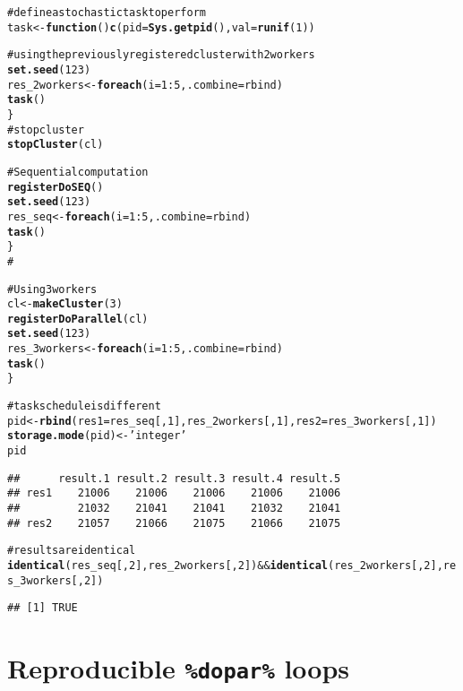 \documentclass[a4paper,12pt]{article}\usepackage{graphicx, color}
\makeatletter
\newcommand{\hlfunctioncall}[1]{\textcolor[rgb]{0.501960784313725,0,0.329411764705882}{\textbf{#1}}}%
\newcommand{\hlstring}[1]{\textcolor[rgb]{0.6,0.6,1}{#1}}%
\newcommand{\hlcomment}[1]{\textcolor[rgb]{0.180392156862745,0.6,0.341176470588235}{#1}}%
\newenvironment{kframe}{%
 \def\at@end@of@kframe{}%
 \ifinner\ifhmode%
  \def\at@end@of@kframe{\end{minipage}}%
  \begin{minipage}{\columnwidth}%
 \fi\fi%
 \def\FrameCommand##1{\hskip\@totalleftmargin \hskip-\fboxsep
 \colorbox{shadecolor}{##1}\hskip-\fboxsep
     \hskip-\linewidth \hskip-\@totalleftmargin \hskip\columnwidth}%
 \MakeFramed {\advance\hsize-\width
   \@totalleftmargin\z@ \linewidth\hsize
   \@setminipage}}%
 {\par\unskip\endMakeFramed%
 \at@end@of@kframe}
\newenvironment{knitrout}{}{} %
\renewenvironment{knitrout}{\begin{footnotesize}}{\end{footnotesize}}
\makeatother
\begin{document}
\begin{knitrout}
\color{fgcolor}\begin{kframe}
\begin{alltt}

\hlcomment{# define a stochastic task to perform}
task <- \hlfunctioncall{function}() \hlfunctioncall{c}(pid=\hlfunctioncall{Sys.getpid}(), val=\hlfunctioncall{runif}(1))

\hlcomment{# using the previously registered cluster with 2 workers}
\hlfunctioncall{set.seed}(123)
res_2workers <- \hlfunctioncall{foreach}(i=1:5, .combine=rbind) %dorng% \{
	\hlfunctioncall{task}()
\}
\hlcomment{# stop cluster}
\hlfunctioncall{stopCluster}(cl)

\hlcomment{# Sequential computation}
\hlfunctioncall{registerDoSEQ}()
\hlfunctioncall{set.seed}(123)
res_seq <- \hlfunctioncall{foreach}(i=1:5, .combine=rbind) %dorng% \{
	\hlfunctioncall{task}() 
\}
\hlcomment{#}

\hlcomment{# Using 3 workers}
cl <- \hlfunctioncall{makeCluster}(3)
\hlfunctioncall{registerDoParallel}(cl)
\hlfunctioncall{set.seed}(123)
res_3workers <- \hlfunctioncall{foreach}(i=1:5, .combine=rbind) %dorng% \{ 
	\hlfunctioncall{task}()
\}

\hlcomment{# task schedule is different}
pid <- \hlfunctioncall{rbind}(res1=res_seq[,1], res_2workers[,1], res2=res_3workers[,1])
\hlfunctioncall{storage.mode}(pid) <- \hlstring{'integer'}
pid
\end{alltt}
\begin{verbatim}
##      result.1 result.2 result.3 result.4 result.5
## res1    21006    21006    21006    21006    21006
##         21032    21041    21041    21032    21041
## res2    21057    21066    21075    21066    21075
\end{verbatim}
\begin{alltt}
\hlcomment{# results are identical}
\hlfunctioncall{identical}(res_seq[,2], res_2workers[,2]) && \hlfunctioncall{identical}(res_2workers[,2], res_3workers[,2])
\end{alltt}
\begin{verbatim}
## [1] TRUE
\end{verbatim}
\end{kframe}
\end{knitrout}


\section{Reproducible \texttt{\%dopar\%} loops}
\end{document}
